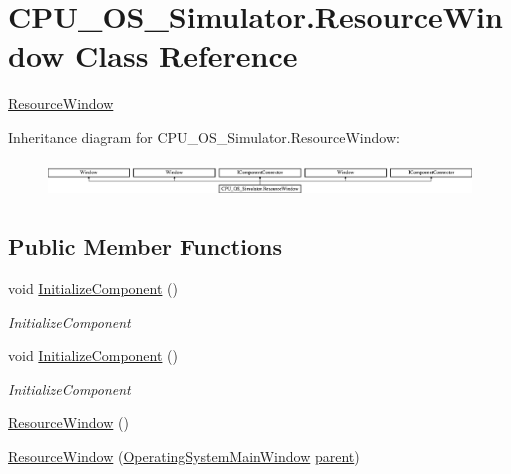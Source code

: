 \hypertarget{class_c_p_u___o_s___simulator_1_1_resource_window}{}\section{C\+P\+U\+\_\+\+O\+S\+\_\+\+Simulator.\+Resource\+Window Class Reference}
\label{class_c_p_u___o_s___simulator_1_1_resource_window}


\hyperlink{class_c_p_u___o_s___simulator_1_1_resource_window}{Resource\+Window}  


Inheritance diagram for C\+P\+U\+\_\+\+O\+S\+\_\+\+Simulator.\+Resource\+Window\+:\begin{figure}[H]
\begin{center}
\leavevmode
\includegraphics[height=0.969697cm]{class_c_p_u___o_s___simulator_1_1_resource_window}
\end{center}
\end{figure}
\subsection*{Public Member Functions}
\begin{DoxyCompactItemize}
\item 
void \hyperlink{class_c_p_u___o_s___simulator_1_1_resource_window_aed9b4e38bfa39491fcdc31b7af0025e9}{Initialize\+Component} ()
\begin{DoxyCompactList}\small\item\em Initialize\+Component \end{DoxyCompactList}\item 
void \hyperlink{class_c_p_u___o_s___simulator_1_1_resource_window_aed9b4e38bfa39491fcdc31b7af0025e9}{Initialize\+Component} ()
\begin{DoxyCompactList}\small\item\em Initialize\+Component \end{DoxyCompactList}\item 
\hyperlink{class_c_p_u___o_s___simulator_1_1_resource_window_ad4843d3ee21aa70df78444d7e93a3e10}{Resource\+Window} ()
\item 
\hyperlink{class_c_p_u___o_s___simulator_1_1_resource_window_a9166bdc1b79537fd56990c9d2079af84}{Resource\+Window} (\hyperlink{class_c_p_u___o_s___simulator_1_1_operating_system_main_window}{Operating\+System\+Main\+Window} \hyperlink{class_c_p_u___o_s___simulator_1_1_resource_window_ae4e4c81a1aead3892b9848cb2cb87734}{parent})
\end{DoxyCompactItemize}
